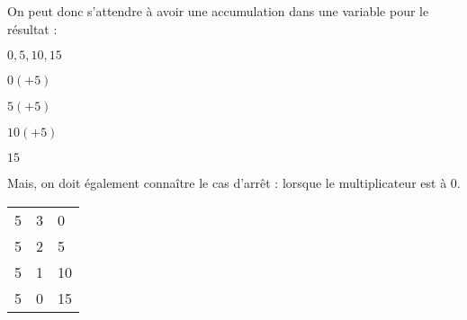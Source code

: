 \documentclass[11pt,a4paper]{article}
\begin{document}
\bigskip

On peut donc s'attendre à avoir une accumulation dans une variable pour le résultat :
\begin{center}

$ 0, 5, 10, 15 $

\bigskip

$ 0 (+ 5) $

$ 5 (+ 5) $

$ 10 (+ 5) $

$ 15 $
\end{center}

\bigskip

Mais, on doit également connaître le cas d'arrêt : lorsque le multiplicateur est à $ 0 $.


\begin{center}
\begin{tabular}{|C{1cm}|C{1cm}|C{1cm}|}
  & 3 &  0 \\
  5 & 2 &  5 \\
  5 & 1 & 10 \\
  5 & 0 & 15 \\
 \hline
\end{tabular}
\end{center}


\newpage

\vfillFirst
\end{document}
